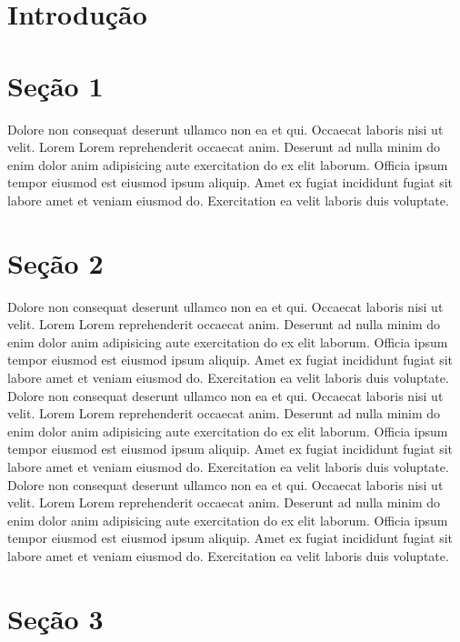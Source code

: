 \documentclass[12pt]{report}
\begin{document}
\section*{Introdução}


\section{Seção 1}

Dolore non consequat deserunt ullamco non ea et qui. Occaecat laboris nisi ut velit. Lorem Lorem reprehenderit occaecat anim. Deserunt ad nulla minim do enim dolor anim adipisicing aute exercitation do ex elit laborum. Officia ipsum tempor eiusmod est eiusmod ipsum aliquip. Amet ex fugiat incididunt fugiat sit labore amet et veniam eiusmod do. Exercitation ea velit laboris duis voluptate.

\section{Seção 2}

Dolore non consequat deserunt ullamco non ea et qui. Occaecat laboris nisi ut velit. Lorem Lorem reprehenderit occaecat anim. Deserunt ad nulla minim do enim dolor anim adipisicing aute exercitation do ex elit laborum. Officia ipsum tempor eiusmod est eiusmod ipsum aliquip. Amet ex fugiat incididunt fugiat sit labore amet et veniam eiusmod do. Exercitation ea velit laboris duis voluptate.
Dolore non consequat deserunt ullamco non ea et qui. Occaecat laboris nisi ut velit. Lorem Lorem reprehenderit occaecat anim. Deserunt ad nulla minim do enim dolor anim adipisicing aute exercitation do ex elit laborum. Officia ipsum tempor eiusmod est eiusmod ipsum aliquip. Amet ex fugiat incididunt fugiat sit labore amet et veniam eiusmod do. Exercitation ea velit laboris duis voluptate.
Dolore non consequat deserunt ullamco non ea et qui. Occaecat laboris nisi ut velit. Lorem Lorem reprehenderit occaecat anim. Deserunt ad nulla minim do enim dolor anim adipisicing aute exercitation do ex elit laborum. Officia ipsum tempor eiusmod est eiusmod ipsum aliquip. Amet ex fugiat incididunt fugiat sit labore amet et veniam eiusmod do. Exercitation ea velit laboris duis voluptate.

\section{Seção 3}
\end{document}
